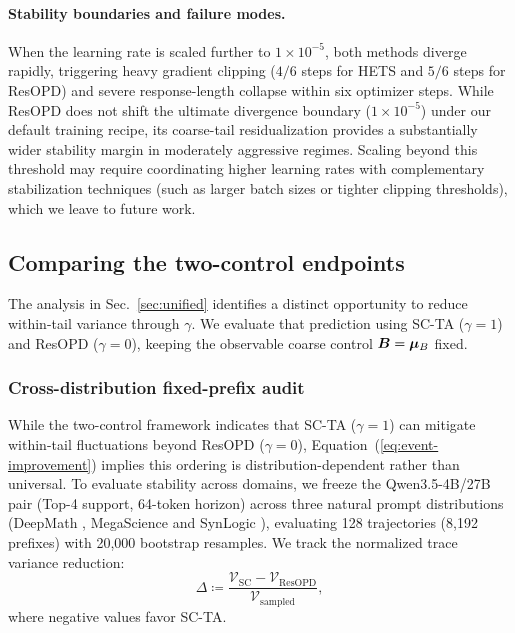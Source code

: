 \paragraph{Stability boundaries and failure modes.}
When the learning rate is scaled further to $1\times10^{-5}$, both methods diverge rapidly, triggering heavy gradient clipping ($4/6$ steps for HETS and $5/6$ steps for ResOPD) and severe response-length collapse within six optimizer steps. While ResOPD does not shift the ultimate divergence boundary ($1\times10^{-5}$) under our default training recipe, its coarse-tail residualization provides a substantially wider stability margin in moderately aggressive regimes. Scaling beyond this threshold may require coordinating higher learning rates with complementary stabilization techniques (such as larger batch sizes or tighter clipping thresholds), which we leave to future work.
\vspace{-4mm}

\subsection{Comparing the two-control endpoints}
\label{sec:control-comparison}

The analysis in Sec.~\ref{sec:unified} identifies a distinct opportunity to
reduce within-tail variance through $\gamma$. We evaluate that prediction
using SC-TA ($\gamma=1$) and ResOPD ($\gamma=0$), keeping the observable
coarse control $\bm B=\bm{\mu}_B$ fixed.

\subsubsection{Cross-distribution fixed-prefix audit}
While the two-control framework indicates that SC-TA ($\gamma=1$) can mitigate within-tail fluctuations beyond ResOPD ($\gamma=0$), Equation~(\ref{eq:event-improvement}) implies this ordering is distribution-dependent rather than universal. To evaluate stability across domains, we freeze the Qwen3.5-4B/27B pair (Top-4 support, 64-token horizon) across three natural prompt distributions (DeepMath \citep{deepmath}, MegaScience \citep{fan2025megascience} and SynLogic \citep{liu2026synlogic}), evaluating 128 trajectories (8,192 prefixes) with 20,000 bootstrap resamples. We track the normalized trace variance reduction:
\begin{equation}
  \Delta \coloneqq \frac{\mathcal{V}_{\mathrm{SC}} - \mathcal{V}_{\mathrm{ResOPD}}}{\mathcal{V}_{\mathrm{sampled}}},
\end{equation}
where negative values favor SC-TA.

